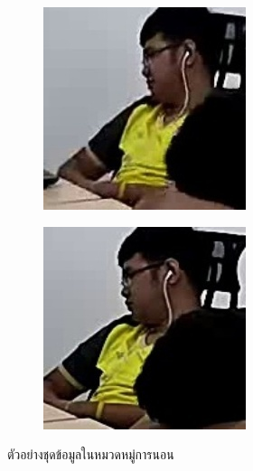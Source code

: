 \begin{figure}[!ht]
\begin{subfigure}[b]{0.45\linewidth}
    \end{subfigure}
    \begin{subfigure}[b]{0.45\linewidth}
      \includegraphics[width=\linewidth]{appendix/sleep/000_CXS0_D0_000073.jpg}
    \end{subfigure}
    \begin{subfigure}[b]{0.45\linewidth}
      \includegraphics[width=\linewidth]{appendix/sleep/002_CXS0_D0_000647.jpg}
    \end{subfigure}
    \caption{ตัวอย่างชุดข้อมูลในหมวดหมู่การนอน}
    \label{fig:result_track}
  \end{figure}

